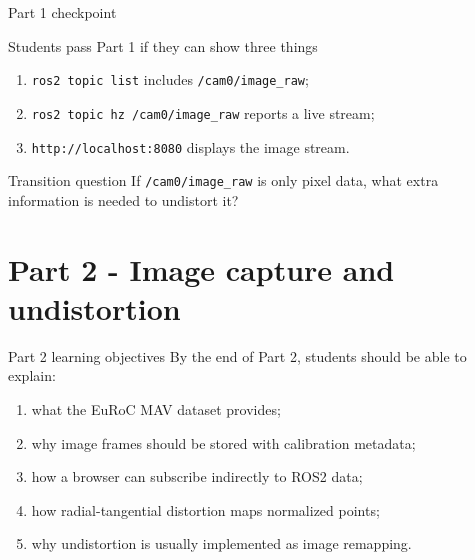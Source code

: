 \documentclass[aspectratio=169,10pt]{beamer}
\newcommand{\code}[1]{\texttt{#1}}
\begin{document}
\begin{frame}{Part 1 checkpoint}
  \begin{block}{Students pass Part 1 if they can show three things}
    \begin{enumerate}
      \item \code{ros2 topic list} includes \code{/cam0/image\_raw};
      \item \code{ros2 topic hz /cam0/image\_raw} reports a live stream;
      \item \code{http://localhost:8080} displays the image stream.
    \end{enumerate}
  \end{block}
  \vspace{0.8em}
  \begin{alertblock}{Transition question}
    If \code{/cam0/image\_raw} is only pixel data, what extra information is needed to undistort it?
  \end{alertblock}
\end{frame}

\section{Part 2 - Image capture and undistortion}

\begin{frame}{Part 2 learning objectives}
  By the end of Part 2, students should be able to explain:
  \begin{enumerate}
    \item what the EuRoC MAV dataset provides;
    \item why image frames should be stored with calibration metadata;
    \item how a browser can subscribe indirectly to ROS2 data;
    \item how radial-tangential distortion maps normalized points;
    \item why undistortion is usually implemented as image remapping.
  \end{enumerate}
\end{frame}
\end{document}
